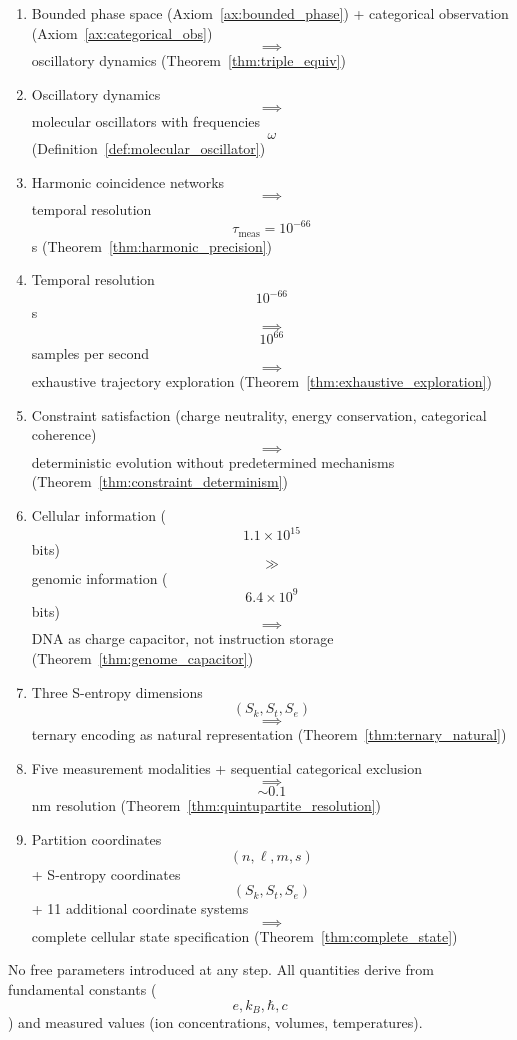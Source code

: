 \documentclass[11pt,twocolumn,a4paper]{article}
\theoremstyle{remark}
\begin{document}
\begin{enumerate}
\item Bounded phase space (Axiom~\ref{ax:bounded_phase}) + categorical observation (Axiom~\ref{ax:categorical_obs}) $$\implies$$ oscillatory dynamics (Theorem~\ref{thm:triple_equiv})

\item Oscillatory dynamics $$\implies$$ molecular oscillators with frequencies $$\omega$$ (Definition~\ref{def:molecular_oscillator})

\item Harmonic coincidence networks $$\implies$$ temporal resolution $$\tau_{\mathrm{meas}} = 10^{-66}$$ s (Theorem~\ref{thm:harmonic_precision})

\item Temporal resolution $$10^{-66}$$ s $$\implies$$ $$10^{66}$$ samples per second $$\implies$$ exhaustive trajectory exploration (Theorem~\ref{thm:exhaustive_exploration})

\item Constraint satisfaction (charge neutrality, energy conservation, categorical coherence) $$\implies$$ deterministic evolution without predetermined mechanisms (Theorem~\ref{thm:constraint_determinism})

\item Cellular information ($$1.1 \times 10^{15}$$ bits) $$\gg$$ genomic information ($$6.4 \times 10^9$$ bits) $$\implies$$ DNA as charge capacitor, not instruction storage (Theorem~\ref{thm:genome_capacitor})

\item Three S-entropy dimensions $$(S_k, S_t, S_e)$$ $$\implies$$ ternary encoding as natural representation (Theorem~\ref{thm:ternary_natural})

\item Five measurement modalities + sequential categorical exclusion $$\implies$$ $$\sim 0.1$$ nm resolution (Theorem~\ref{thm:quintupartite_resolution})

\item Partition coordinates $$(n,\ell,m,s)$$ + S-entropy coordinates $$(S_k,S_t,S_e)$$ + 11 additional coordinate systems $$\implies$$ complete cellular state specification (Theorem~\ref{thm:complete_state})
\end{enumerate}

No free parameters introduced at any step. All quantities derive from fundamental constants ($$e, k_B, \hbar, c$$) and measured values (ion concentrations, volumes, temperatures).
\end{document}
